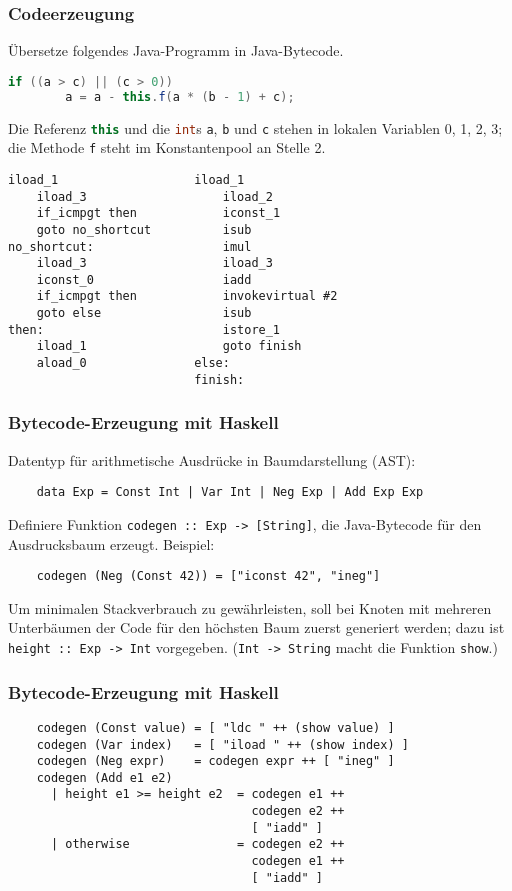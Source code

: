 \documentclass{beamer}
\begin{document}
\begin{frame}[fragile]
  \frametitle{Codeerzeugung}
  Übersetze folgendes Java-Programm in Java-Bytecode.
  \begin{lstlisting}[language=Java]
    if ((a > c) || (c > 0))
        a = a - this.f(a * (b - 1) + c);
  \end{lstlisting}
  Die Referenz \lstinline[language=Java]{this} und die \lstinline[language=Java]{int}s \lstinline{a}, \lstinline{b} und \lstinline{c} stehen in lokalen Variablen 0, 1, 2, 3;
  die Methode \lstinline{f} steht im Konstantenpool an Stelle 2.
  \pause
  \begin{lstlisting}[language=jasmin,autogobble=false]
    iload_1                   iload_1           
    iload_3                   iload_2           
    if_icmpgt then            iconst_1          
    goto no_shortcut          isub              
no_shortcut:                  imul              
    iload_3                   iload_3           
    iconst_0                  iadd              
    if_icmpgt then            invokevirtual #2  
    goto else                 isub              
then:                         istore_1          
    iload_1                   goto finish       
    aload_0               else:                 
                          finish:
  \end{lstlisting}
\end{frame}

\begin{frame}[fragile]
  \frametitle{Bytecode-Erzeugung mit Haskell}
  \lstset{language=Haskell}
  Datentyp für arithmetische Ausdrücke in Baumdarstellung (AST):
  \begin{lstlisting}
    data Exp = Const Int | Var Int | Neg Exp | Add Exp Exp
  \end{lstlisting}
  Definiere Funktion \lstinline{codegen :: Exp -> [String]}, die Java-Bytecode für den Ausdrucksbaum erzeugt. Beispiel:
  \begin{lstlisting}
    codegen (Neg (Const 42)) = ["iconst 42", "ineg"]
  \end{lstlisting}
  Um minimalen Stackverbrauch zu gewährleisten, soll bei Knoten mit mehreren Unterbäumen der Code für den höchsten Baum zuerst generiert werden;
  dazu ist \lstinline{height :: Exp -> Int} vorgegeben.
  (\lstinline{Int -> String} macht die Funktion \lstinline{show}.)
\end{frame}

\begin{frame}[fragile]
  \frametitle{Bytecode-Erzeugung mit Haskell}
  \lstset{language=Haskell}
  \begin{lstlisting}
    codegen (Const value) = [ "ldc " ++ (show value) ]
    codegen (Var index)   = [ "iload " ++ (show index) ]
    codegen (Neg expr)    = codegen expr ++ [ "ineg" ]
    codegen (Add e1 e2)
      | height e1 >= height e2  = codegen e1 ++
                                  codegen e2 ++
                                  [ "iadd" ]
      | otherwise               = codegen e2 ++
                                  codegen e1 ++
                                  [ "iadd" ]
  \end{lstlisting}
\end{frame}
\end{document}

